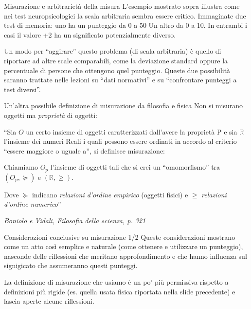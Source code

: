 \documentclass[
  ignorenonframetext,
]{beamer}
\begin{document}
\begin{frame}{Misurazione e arbitrarietà della misura}
\label{misurazione-e-arbitrarietuxe0-della-misura}
L'esempio mostrato sopra illustra come nei test neuropsicologici la
scala arbitraria sembra essere critico. Immaginate due test di memoria:
uno ha un punteggio da 0 a 50 Un altro da 0 a 10. In entrambi i casi il
valore +2 ha un significato potenzialmente diverso.

Un modo per ``aggirare'' questo problema (di scala arbitraria) è quello
di riportare ad altre scale comparabili, come la deviazione standard
oppure la percentuale di persone che ottengono quel punteggio. Queste
due possibilità saranno trattate nelle lezioni su ``dati normativi'' e
su ``confrontare punteggi a test diversi''.
\end{frame}

\begin{frame}{Un'altra possibile definizione di misurazione da filosofia
e fisica}
\label{unaltra-possibile-definizione-di-misurazione-da-filosofia-e-fisica}
Non si misurano oggetti ma \emph{proprietà} di oggetti:

``Sia \(O\) un certo insieme di oggetti caratterizzati dall'avere la
proprietà P e sia \(\mathbb{R}\) l'insieme dei numeri Reali i quali
possono essere ordinati in accordo al criterio ``essere maggiore o
uguale a'', si definisce misurazione:

Chiamiamo \(O_p\) l'insieme di oggetti tali che si crei un
``omomorfismo'' tra \((O_p, \succcurlyeq)\) e \((\mathbb{R}, \geq)\).

Dove \(\succcurlyeq\) indicano \emph{relazioni d’ordine empirico}
(oggetti fisici) e \(\geq\) \emph{relazioni d’ordine numerico}''

\begin{flushright}
\emph{Boniolo e Vidali, Filosofia della scienza, p. 321}
\end{flushright}
\end{frame}

\begin{frame}{Considerazioni conclusive su misurazione 1/2}
\label{considerazioni-conclusive-su-misurazione-12}
Queste considerazioni mostrano come un atto così semplice e naturale
(come ottenere e utilizzare un punteggio), nasconde delle riflessioni
che meritano approfondimento e che hanno influenza sul signigicato che
assumeranno questi punteggi.

La definizione di misurazione che usiamo è un po' più permissiva
rispetto a definizioni più rigide (es. quella usata fisica riportata
nella slide precedente) e lascia aperte alcune riflessioni.
\end{frame}
\end{document}
